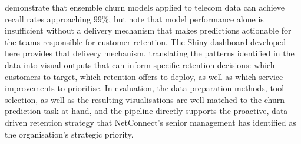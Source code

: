 \documentclass[12pt,a4paper]{article}
\begin{document}
\textcite{Zhou2023} demonstrate that ensemble churn models applied to telecom data can achieve recall rates approaching 99\%, but note that model performance alone is insufficient without a delivery mechanism that makes predictions actionable for the teams responsible for customer retention. The Shiny dashboard developed here provides that delivery mechanism, translating the patterns identified in the data into visual outputs that can inform specific retention decisions: which customers to target, which retention offers to deploy, as well as which service improvements to prioritise. In evaluation, the data preparation methods, tool selection, as well as the resulting visualisations are well-matched to the churn prediction task at hand, and the pipeline directly supports the proactive, data-driven retention strategy that NetConnect's senior management has identified as the organisation's strategic priority.

\newpage
\printbibliography[title={References}]

\newpage
\listoffigures
\end{document}
